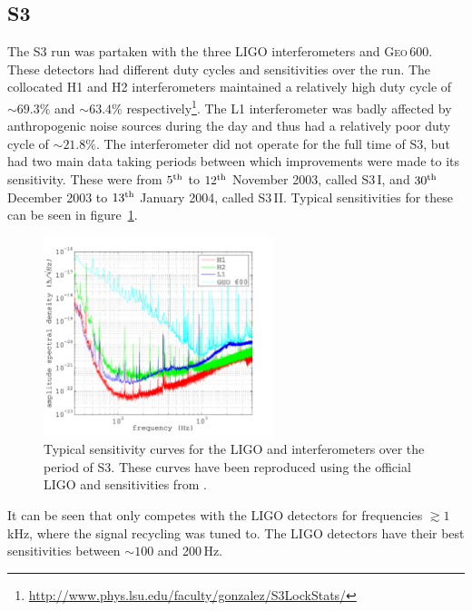 \subsection{S3}
The S3 run was partaken with the three LIGO interferometers and G\textsc{eo}\,600. These detectors
had different duty cycles and sensitivities over the run. The collocated H1 and H2 interferometers
maintained a relatively high duty cycle of $\sim 69.3\%$ and $\sim 63.4\%$
respectively\footnote{\url{http://www.phys.lsu.edu/faculty/gonzalez/S3LockStats/}}. The L1
interferometer was badly affected by anthropogenic noise sources during the day and thus had a
relatively poor duty cycle of $\sim 21.8\%$. The \geo interferometer did not operate for the full
time of S3, but had two main data taking periods between which improvements were made to its
sensitivity. These were from $5^{\rm th}$ to $12^{\rm th}$ November 2003, called S3\,I, and $30^{\rm
th}$ December 2003 to $13^{\rm th}$ January 2004, called S3\,II. Typical sensitivities for these can
be seen in figure~\ref{S3SensitivityCurves}.
\begin{figure}[!htbp]
\begin{center}
\includegraphics[width=0.6\textwidth]{figs/S3SensitivityCurves}\caption[Typical sensitivity curves
for the LIGO and \geo interferometers over the period of S3.]{Typical sensitivity curves for the
LIGO and \geo interferometers over the period of S3. These curves have been reproduced using the
official LIGO and \geo sensitivities from \cite{LIGOsensitivity,
GEOsensitivity}.}\label{S3SensitivityCurves}
\end{center}
\end{figure}
It can be seen that \geo only competes with the LIGO detectors for frequencies $\gtrsim 1$\,kHz,
where the signal recycling was tuned to. The LIGO detectors have their best sensitivities between
$\sim 100$ and 200\,Hz.

